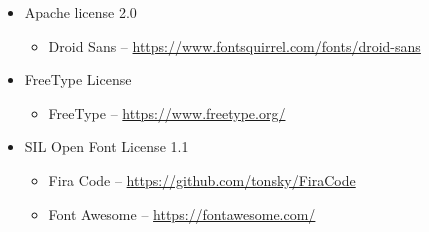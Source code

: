 \documentclass[hidelinks,titlepage,a4paper]{article}
\begin{document}
\begin{itemize}
\item Apache license 2.0
\begin{itemize}
\item Droid Sans -- \url{https://www.fontsquirrel.com/fonts/droid-sans}
\end{itemize}

\item FreeType License
\begin{itemize}
\item FreeType -- \url{https://www.freetype.org/}
\end{itemize}

\item SIL Open Font License 1.1
\begin{itemize}
\item Fira Code -- \url{https://github.com/tonsky/FiraCode}
\item Font Awesome -- \url{https://fontawesome.com/}
\end{itemize}

\end{itemize}



\end{document}
